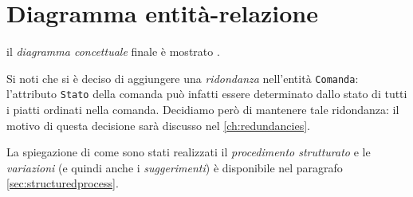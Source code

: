 \section{Diagramma entità-relazione}
il {\it diagramma concettuale} finale è mostrato .

Si noti che si è deciso di aggiungere una {\it ridondanza} nell'entità {\tt Comanda}:
l'attributo {\tt Stato} della comanda può infatti essere determinato dallo stato di
tutti i piatti ordinati nella comanda. Decidiamo però di mantenere tale ridondanza:
il motivo di questa decisione sarà discusso nel \vref{ch:redundancies}.

La spiegazione di come sono stati realizzati il {\it procedimento strutturato} e le {\it variazioni}
(e quindi anche i {\it suggerimenti}) è disponibile nel paragrafo \vref{sec:structuredprocess}.
\label{fig:conceptdiagram}
